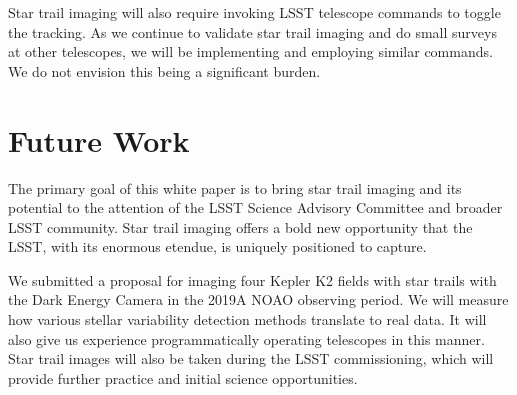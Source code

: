 \documentclass[12pt, letterpaper]{article}
\begin{document}
Star trail imaging will also require invoking LSST telescope commands to toggle the tracking. As we continue to validate star trail imaging and do small surveys at other telescopes, we will be implementing and employing similar commands. We do not envision this being a significant burden.

\section{Future Work}
\label{sec:future}

The primary goal of this white paper is to bring star trail imaging and its potential to the attention of the LSST Science Advisory Committee and broader LSST community. Star trail imaging offers a bold new opportunity that the LSST, with its enormous etendue, is uniquely positioned to capture. 


We submitted a proposal for imaging four Kepler K2 fields with star trails with the Dark Energy Camera in the 2019A NOAO observing period. We will measure how various stellar variability detection methods translate to real data. It will also give us experience programmatically operating telescopes in this manner. Star trail images will also be taken during the LSST commissioning, which will provide further practice and initial science opportunities. 



\end{document}
